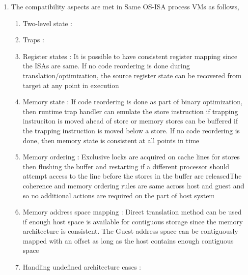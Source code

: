 \documentclass[11pt,a4paper,oneside]{article}
\begin{document}
\begin{enumerate}
		\item The compatibility aspects are met in Same OS-ISA process VMs as follows,
			\begin{enumerate}
				\item Two-level state : 
				\item Traps : 
				\item Register states : It is possible to have consistent register mapping since the ISAs are same. If no code reordering is done during translation/optimization, the source register state can be recovered from target at any point in execution
				\item Memory state : If code reordering is done as part of binary optimization, then runtime trap handler can emulate the store instruction if trapping instruciton is moved ahead of  store or memory stores can be buffered if the trapping instruction is moved  below a store. If no code reordering is done, then memory state is consistent at all points in time
				\item Memory ordering : Exclusive locks are acquired on cache lines for stores 
			 then flushing the buffer and restarting if a different processor
				should attempt access to the line before the stores in the buffer are releasedThe coherence and memory ordering rules are same across host and guest and so no additional actions are required on the part of host system
				\item Memory address space mapping : Direct translation method can be used if enough host space is available for contiguous storage since the memory architecture is consistent. The Guest address space can be contiguously mapped with an offset as long as the host contains enough contiguous space
				\item Handling undefined architecture cases : 
			\end{enumerate}
		

\end{enumerate}
\end{document}
